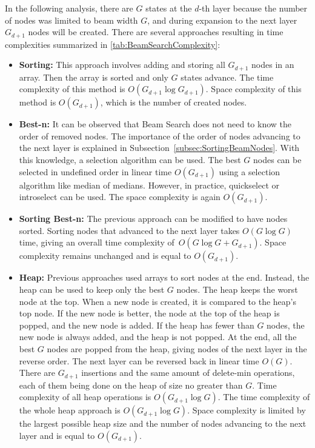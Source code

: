 \documentclass[shortabstract, mgr, english]{iithesis}
\begin{document}
In the following analysis, there are $G$ states at the $d$-th layer because the number of nodes was limited to beam width $G$, and during expansion to the next layer $G_{d+1}$ nodes will be created. There are several approaches resulting in time complexities summarized in \ref{tab:BeamSearchComplexity}:
\begin{itemize}
    \item \textbf{Sorting:} This approach involves adding and storing all $G_{d+1}$ nodes in an array. Then the array is sorted and only $G$ states advance. The time complexity of this method is $O(G_{d+1}\log G_{d+1})$. Space complexity of this method is $O(G_{d+1})$, which is the number of created nodes.
    \item \textbf{Best-n:} It can be observed that Beam Search does not need to know the order of removed nodes. The importance of the order of nodes advancing to the next layer is explained in Subsection~\ref{subsec:SortingBeamNodes}. With this knowledge, a selection algorithm can be used.
    The best $G$ nodes can be selected in undefined order in linear time $O(G_{d+1})$ using a selection algorithm like median of medians. However, in practice, quickselect or introselect can be used. The space complexity is again $O(G_{d+1})$.
    \item \textbf{Sorting Best-n:} The previous approach can be modified to have nodes sorted. Sorting nodes that advanced to the next layer takes $O(G\log G)$ time, giving an overall time complexity of~${O(G\log G+G_{d+1})}$. Space complexity remains unchanged and is equal to $O(G_{d+1})$.
    \item \textbf{Heap:} Previous approaches used arrays to sort nodes at the end. Instead, the heap can be used to keep only the best $G$ nodes. The heap keeps the worst node at the top. When a new node is created, it is compared to the heap's top node. If the new node is better, the node at the top of the heap is popped, and the new node is added. If the heap has fewer than $G$ nodes, the new node is always added, and the heap is not popped. At the end, all the best $G$ nodes are popped from the heap, giving nodes of the next layer in the reverse order. The next layer can be reversed back in linear time $O(G)$. There are $G_{d+1}$ insertions and the same amount of delete-min operations, each of them being done on the heap of size no greater than $G$. Time complexity of all heap operations is $O(G_{d+1}\log G)$. The time complexity of the whole heap approach is $O(G_{d+1}\log G)$. Space complexity is limited by the largest possible heap size and the number of nodes advancing to the next layer and is equal to $O(G_{d+1})$.


\end{itemize}
\end{document}
